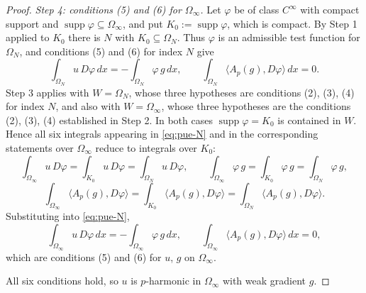 \begin{proof}
\medskip\noindent\emph{Step 4: conditions (5) and (6) for $\Omega_\infty$.}
Let $\varphi$ be of class $C^\infty$ with compact support and
$\operatorname{supp}\varphi\subseteq\Omega_\infty$, and put $K_0:=\operatorname{supp}\varphi$,
which is compact.  By Step 1 applied to $K_0$ there is $N$ with $K_0\subseteq\Omega_N$.  Thus
$\varphi$ is an admissible test function for $\Omega_N$, and conditions (5) and (6) for index
$N$ give
\begin{equation}\label{eq:pue-N}
  \int_{\Omega_N}u\,D\varphi\,dx=-\int_{\Omega_N}\varphi\,g\,dx,
  \qquad
  \int_{\Omega_N}\bigl\langle A_p(g),D\varphi\bigr\rangle\,dx=0 .
\end{equation}
Step 3 applies with $W=\Omega_N$, whose three hypotheses are conditions (2), (3), (4) for index
$N$, and also with $W=\Omega_\infty$, whose three hypotheses are the conditions (2), (3), (4)
established in Step 2.  In both cases $\operatorname{supp}\varphi=K_0$ is contained in $W$.
Hence all six integrals appearing in \eqref{eq:pue-N} and in the corresponding statements over
$\Omega_\infty$ reduce to integrals over $K_0$:
\[
  \int_{\Omega_\infty}u\,D\varphi=\int_{K_0}u\,D\varphi=\int_{\Omega_N}u\,D\varphi,
  \qquad
  \int_{\Omega_\infty}\varphi\,g=\int_{K_0}\varphi\,g=\int_{\Omega_N}\varphi\,g,
\]
\[
  \int_{\Omega_\infty}\bigl\langle A_p(g),D\varphi\bigr\rangle
  =\int_{K_0}\bigl\langle A_p(g),D\varphi\bigr\rangle
  =\int_{\Omega_N}\bigl\langle A_p(g),D\varphi\bigr\rangle .
\]
Substituting into \eqref{eq:pue-N},
\[
  \int_{\Omega_\infty}u\,D\varphi\,dx=-\int_{\Omega_\infty}\varphi\,g\,dx,
  \qquad
  \int_{\Omega_\infty}\bigl\langle A_p(g),D\varphi\bigr\rangle\,dx=0 ,
\]
which are conditions (5) and (6) for $u$, $g$ on $\Omega_\infty$.

\medskip\noindent All six conditions hold, so $u$ is $p$-harmonic in $\Omega_\infty$ with weak
gradient $g$.
\end{proof}
